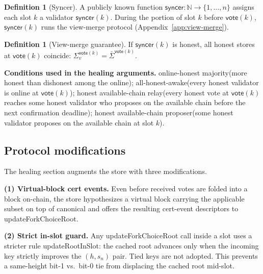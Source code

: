 \documentclass{article}
\newcommand{\vote}{\mathsf{vote}}
\newcommand{\syncer}{\mathsf{syncer}}
\newcommand{\OHM}{online-honest majority\xspace}
\newcommand{\HAP}{honest available-chain proposer\xspace}
\newcommand{\HAR}{honest available-chain relay\xspace}
\newcommand{\AHA}{all-honest-awake\xspace}
\newcommand{\updateForkChoiceRoot}{\textsf{updateForkChoiceRoot}\xspace}
\newcommand{\updateRootInSlot}{\textsf{updateRootInSlot}\xspace}
\newcommand{\comm}[1]{\bar{#1}}
\theoremstyle{plain}
\theoremstyle{definition}
\newtheorem{definition}[theorem]{Definition}
\theoremstyle{remark}
\renewcommand{\paragraph}[1]{\vspace{6pt}\noindent\textbf{#1}}
\begin{document}
\begin{definition}[Syncer]\label{def:syncer}
A publicly known function $\syncer \colon \mathbb{N} \to \{1, \ldots, n\}$ assigns each slot $k$ a validator $\syncer(k)$. During the portion of slot $k$ before $\vote(k)$, $\syncer(k)$ runs the view-merge protocol (Appendix~\ref{app:view-merge}).
\end{definition}

\begin{definition}[View-merge guarantee]\label{ass:view-merge}
If $\syncer(k)$ is honest, all honest stores at $\vote(k)$ coincide: $\Sigma_v^{\vote(k)} = \comm{\Sigma}^{\vote(k)}$.
\end{definition}

\paragraph{Conditions used in the healing arguments.} \OHM (more honest than dishonest among the online); \AHA (every honest validator is online at $\vote(k)$); \HAR (every honest vote at $\vote(k)$ reaches some honest validator who proposes on the available chain before the next confirmation deadline); \HAP (some honest validator proposes on the available chain at slot $k$).

\subsection{Protocol modifications}

The healing section augments the store with three modifications.

\paragraph{(1) Virtual-block cert events.} Even before received votes are folded into a block on-chain, the store hypothesizes a virtual block carrying the applicable subset on top of canonical and offers the resulting cert-event descriptors to \updateForkChoiceRoot.

\paragraph{(2) Strict in-slot guard.} Any \updateForkChoiceRoot{} call inside a slot uses a stricter rule \updateRootInSlot: the cached root advances only when the incoming key strictly improves the $(h, s_n)$ pair. Tied keys are not adopted. This prevents a same-height bit-1 vs.\ bit-0 tie from displacing the cached root mid-slot.
\end{document}
